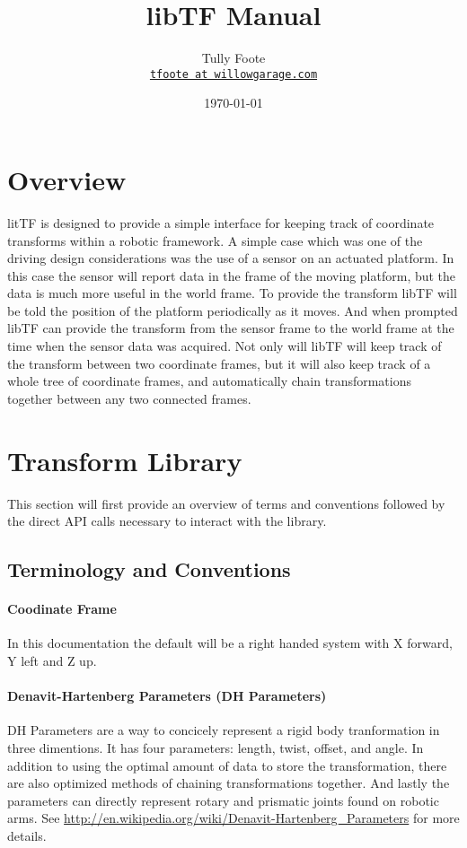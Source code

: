 \documentclass[12pt]{article}
\begin{document}
\title{libTF Manual}
\author{Tully Foote\\
\href{mailto:tfoote@willowgarage.com}{\texttt{tfoote at willowgarage.com}}}
\date{\today}
\maketitle

\tableofcontents
\pagebreak

\section{Overview}
litTF is designed to provide a simple interface for keeping track 
of coordinate transforms within a robotic framework.  
A simple case which was one of the driving design considerations was
the use of a sensor on an actuated platform.  In this case the sensor
will report data in the frame of the moving platform, but the data is much 
more useful in the world frame. To provide the transform libTF will be told 
the position of the platform periodically as it moves.  And when prompted libTF can 
provide the transform from the sensor frame to the world frame at the time when the
sensor data was acquired.  Not only will libTF will keep track of the transform between 
two coordinate frames, but it will also keep track of a whole tree of coordinate frames, 
and automatically chain transformations together between any two connected frames.  

\section{Transform Library}
This section will first provide an overview of terms and conventions followed
by the direct API calls necessary to interact with the library.  

\subsection{Terminology and Conventions}
\paragraph {Coodinate Frame}
In this documentation the default 
will be a right handed system with X forward, Y left and Z up. 

\paragraph {Denavit-Hartenberg Parameters (DH Parameters)}
DH Parameters are a way to concicely represent a rigid body tranformation in three dimentions.  
It has four parameters: length, twist, offset, and angle.  In addition to using the optimal 
amount of data to store the transformation, there are also optimized methods of chaining 
transformations together.  And lastly the parameters can directly represent rotary and prismatic
joints found on robotic arms.  
See \url{http://en.wikipedia.org/wiki/Denavit-Hartenberg_Parameters} for more details.  
\end{document}
